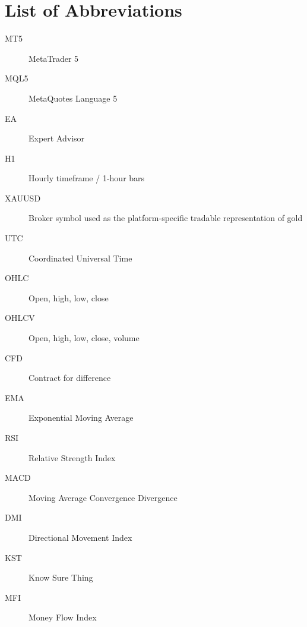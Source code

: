 \chapter*{List of Abbreviations}

\begin{description}
\item[MT5] MetaTrader 5
\item[MQL5] MetaQuotes Language 5
\item[EA] Expert Advisor
\item[H1] Hourly timeframe / 1-hour bars
\item[XAUUSD] Broker symbol used as the platform-specific tradable representation of gold
\item[UTC] Coordinated Universal Time
\item[OHLC] Open, high, low, close
\item[OHLCV] Open, high, low, close, volume
\item[CFD] Contract for difference
\item[EMA] Exponential Moving Average
\item[RSI] Relative Strength Index
\item[MACD] Moving Average Convergence Divergence
\item[DMI] Directional Movement Index
\item[KST] Know Sure Thing
\item[MFI] Money Flow Index
\end{description}




